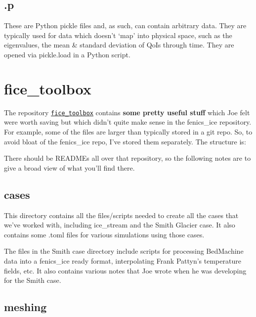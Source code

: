 \documentclass[11pt, reqno, nocenter]{article}
\begin{document}
\subsection{.p}

These are Python pickle files and, as such, can contain arbitrary data. They are typically used for data which doesn't `map' into physical space, such as the eigenvalues, the mean \& standard deviation of QoIs through time. They are opened via pickle.load in a Python script.

\section{fice\_toolbox} \label{sec:toolbox}

The repository \href{https://github.com/EdiGlacUQ/fice_toolbox}{{\tt fice\_toolbox}} contains \textbf{some pretty useful stuff} which Joe felt were worth saving but which didn't quite make sense in the fenics\_ice repository. For example, some of the files are larger than typically stored in a git repo.
So, to avoid bloat of the fenics\_ice repo, I've stored them separately. The structure is: \\


There should be READMEs all over that repository, so the following notes are to give a broad view of what you'll find there.

\subsection{cases}

This directory contains all the files/scripts needed to create all the cases that we've worked with, including ice\_stream and the Smith Glacier case. It also contains some .toml files for various simulations using those cases.

The files in the Smith case directory include scripts for processing BedMachine data into a fenics\_ice ready format, interpolating Frank Pattyn's temperature fields, etc. It also contains various notes that Joe wrote when he was developing for the Smith case.

\subsection{meshing}
\end{document}
